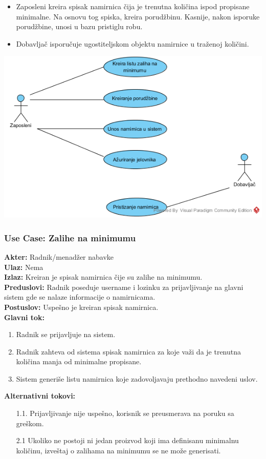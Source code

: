 \documentclass{article}
\begin{document}
\begin{itemize}
\item Zaposleni kreira spisak namirnica čija je trenutna količina ispod propisane minimalne. Na osnovu tog spiska, kreira porudžbinu. Kasnije, nakon isporuke porudžbine, unosi u bazu pristiglu robu.
\item Dobavljač isporučuje ugostiteljskom objektu namirnice u traženoj količini.
\end{itemize}
\includegraphics[width=\textwidth]{SU_1_zalihe.png}
\subsubsection{\textbf{Use Case}: Zalihe na minimumu}
\textbf{Akter:} Radnik/menadžer nabavke\\
\textbf{Ulaz:} Nema\\
\textbf{Izlaz:} Kreiran je spisak namirnica čije su zalihe na minimumu.\\
\textbf{Preduslovi:} Radnik poseduje username i lozinku za prijavljivanje na glavni sistem gde se nalaze informacije o namirnicama.\\
\textbf{Postuslov:} Uspešno je kreiran spisak namirnica.\\
\textbf{Glavni tok:} 
\begin{enumerate}
	\item Radnik se prijavljuje na sistem.
	\item Radnik zahteva od sistema spisak namirnica za koje važi da je trenutna količina manja od minimalne propisane.
	\item Sistem generiše listu namirnica koje zadovoljavaju prethodno navedeni uslov.
\end{enumerate}
\textbf{Alternativni tokovi:} \\
\begin{itemize}
\item [1.1.] Prijavljivanje nije uspešno, korisnik se preusmerava na poruku sa greškom.
\item[2.1] Ukoliko ne postoji ni jedan proizvod koji ima definisanu minimalnu količinu, izveštaj o zalihama na minimumu se ne može generisati.
\end{itemize}
	 
\end{document}
